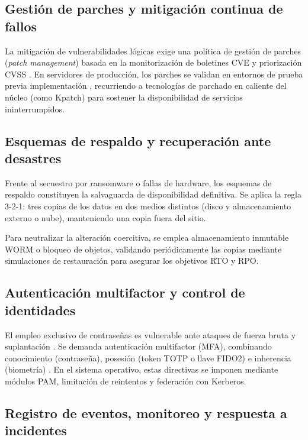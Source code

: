 \documentclass[12pt]{article}
\begin{document}
\subsection{Gestión de parches y mitigación continua de fallos}\label{subsec:gestionParchesMitigacion}

La mitigación de vulnerabilidades lógicas exige una política de gestión de parches (\textit{patch management}) basada en la monitorización de boletines CVE y priorización CVSS \parencite[\S 15.6, p.\ 684]{stallings2018operating}. En servidores de producción, los parches se validan en entornos de prueba previa implementación \parencite[\S 15.5, p.\ 683]{stallings2018operating}, recurriendo a tecnologías de parchado en caliente del núcleo (como Kpatch) para sostener la disponibilidad de servicios ininterrumpidos.

\subsection{Esquemas de respaldo y recuperación ante desastres}\label{subsec:esquemasRespaldoRecuperacion}

Frente al secuestro por ransomware o fallas de hardware, los esquemas de respaldo constituyen la salvaguarda de disponibilidad definitiva. Se aplica la regla 3-2-1: tres copias de los datos en dos medios distintos (disco y almacenamiento externo o nube), manteniendo una copia fuera del sitio.

Para neutralizar la alteración coercitiva, se emplea almacenamiento inmutable WORM o bloqueo de objetos, validando periódicamente las copias mediante simulaciones de restauración para asegurar los objetivos RTO y RPO.

\subsection{Autenticación multifactor y control de identidades}\label{subsec:autenticacionMultifactorIdentidades}

El empleo exclusivo de contraseñas es vulnerable ante ataques de fuerza bruta y suplantación \parencite[\S 19.3.1, p.\ 928]{deitel2004operating}. Se demanda autenticación multifactor (MFA), combinando conocimiento (contraseña), posesión (token TOTP o llave FIDO2) e inherencia (biometría) \parencite[\S 2, p.\ 24]{rfc4949}. En el sistema operativo, estas directivas se imponen mediante módulos PAM, limitación de reintentos y federación con Kerberos.

\subsection{Registro de eventos, monitoreo y respuesta a incidentes}\label{subsec:registroEventosRespuestaIncidentes}
\end{document}
